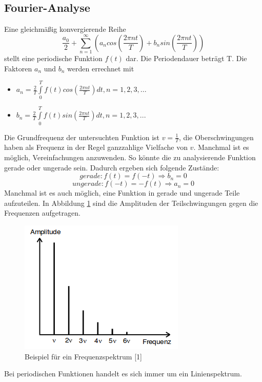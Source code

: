 \documentclass[11pt,ngerman,a4paper]{article}
\begin{document}
\subsection{Fourier-Analyse}
Eine gleichmäßig konvergierende Reihe
\begin{equation}
\frac{a_0}{2}+\sum_{n=1}^\infty \left(a_ncos\left(\frac{2\pi nt}{T}\right)+b_nsin\left(\frac{2\pi nt}{T}\right)\right)
\label{formel1}
\end{equation}
stellt eine periodische Funktion $f(t)$ dar. Die Periodendauer beträgt T. Die Faktoren $a_n$ und $b_n$ werden errechnet mit
\begin{itemize}
\item $a_n=\frac{2}{T}\int\limits_{0}^{T}f(t)cos\left(\frac{2\pi nt}{T}\right)dt , n = 1,2,3,... $
\item $b_n=\frac{2}{T}\int\limits_{0}^{T}f(t)sin\left(\frac{2\pi nt}{T}\right)dt , n = 1,2,3,... $
\end{itemize}
Die Grundfrequenz der untersuchten Funktion ist $v=\frac{1}{T}$, die Oberschwingungen haben als Frequenz in der Regel ganzzahlige Vielfache von $v$.
Manchmal ist es möglich, Vereinfachungen anzuwenden. So könnte die zu analysierende Funktion gerade oder ungerade sein. Dadurch ergeben sich folgende Zustände:
\begin{equation}
gerade: f(t)=f(-t) \Rightarrow b_n=0
\end{equation}
\begin{equation}
ungerade: f(-t)=-f(t) \Rightarrow a_n=0
\end{equation}
Manchmal ist es auch möglich, eine Funktion in gerade und ungerade Teile aufzuteilen. In Abbildung \ref{spektrumtheo} sind die Amplituden der Teilschwingungen gegen die Frequenzen aufgetragen.
\begin{figure}[htp]
\centering
\includegraphics[scale=0.7]{abb/spektrumtheo.png}
\caption{Beispiel für ein Frequenzspektrum [1]}
\label{spektrumtheo}
\end{figure}
Bei periodischen Funktionen handelt es sich immer um ein Linienspektrum.
\end{document}
